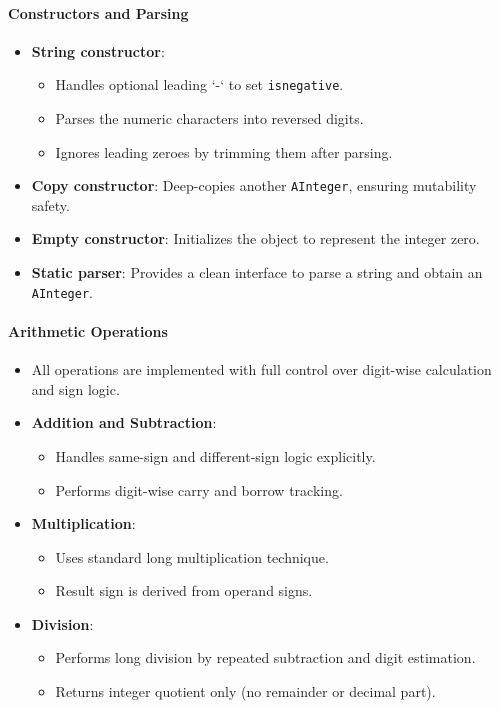 \documentclass[12pt]{article}
\begin{document}
\paragraph*{\textbf{Constructors and Parsing}}
\begin{itemize}
  \item \textbf{String constructor}:
  \begin{itemize}
    \item Handles optional leading `-` to set \texttt{isnegative}.
    \item Parses the numeric characters into reversed digits.
    \item Ignores leading zeroes by trimming them after parsing.
  \end{itemize}
  \item \textbf{Copy constructor}: Deep-copies another \texttt{AInteger}, ensuring mutability safety.
  \item \textbf{Empty constructor}: Initializes the object to represent the integer zero.
  \item \textbf{Static parser}: Provides a clean interface to parse a string and obtain an \texttt{AInteger}.
\end{itemize}

\paragraph*{\textbf{Arithmetic Operations}}
\begin{itemize}
  \item All operations are implemented with full control over digit-wise calculation and sign logic.
  \item \textbf{Addition and Subtraction}:
  \begin{itemize}
    \item Handles same-sign and different-sign logic explicitly.
    \item Performs digit-wise carry and borrow tracking.
  \end{itemize}
  \item \textbf{Multiplication}:
  \begin{itemize}
    \item Uses standard long multiplication technique.
    \item Result sign is derived from operand signs.
  \end{itemize}
  \item \textbf{Division}:
  \begin{itemize}
    \item Performs long division by repeated subtraction and digit estimation.
    \item Returns integer quotient only (no remainder or decimal part).
  \end{itemize}
\end{itemize}
\end{document}

